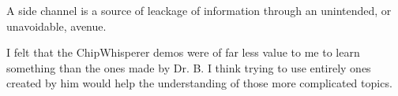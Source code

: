 \medskip


A side channel is a source of leackage of information through an unintended, or unavoidable, avenue. \\

\medskip


I felt that the ChipWhisperer demos were of far less value to me to learn something than the ones made by Dr. B. I think trying to use entirely ones created by him would help the understanding of those more complicated topics.

